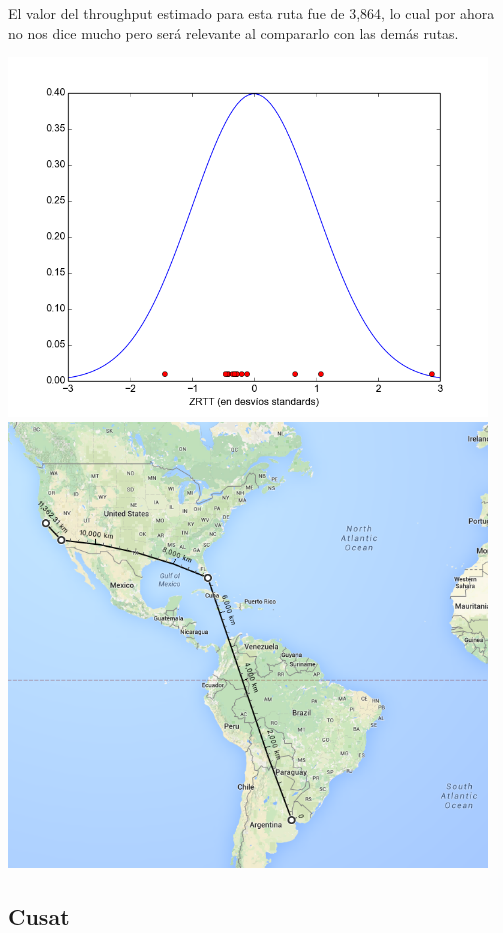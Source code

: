  El valor del throughput estimado para esta ruta fue de 3,864, lo cual por ahora no nos dice mucho pero será relevante al compararlo con las demás rutas.

 \includegraphics[width=5in]{imgs/berkeley_dist.png}
 \includegraphics[width=5in]{imgs/maps/berkeley.png}


\subsection{Cusat}

